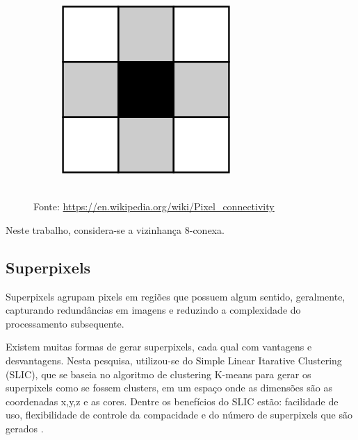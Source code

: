 \documentclass{article}
\begin{document}
\begin{figure}[H]
\begin{subfigure}[b]{50px}
				\includegraphics[width=\textwidth]{3.png}
			\end{subfigure}	\\
			{Fonte: \href{https://en.wikipedia.org/wiki/Pixel\_connectivity}{https://en.wikipedia.org/wiki/Pixel\_connectivity}}	
		\end{figure}
			
		Neste trabalho, considera-se a vizinhança 8-conexa. 
	
	\subsection{Superpixels}
		Superpixels agrupam pixels em regiões que possuem algum sentido, geralmente, capturando redundâncias em imagens e reduzindo a complexidade do processamento subsequente. 
		
		Existem muitas formas de gerar superpixels, cada qual com vantagens e desvantagens. Nesta pesquisa, utilizou-se do Simple Linear Itarative Clustering (SLIC), que se baseia no algoritmo de clustering K-means para gerar os superpixels como se fossem clusters, em um espaço onde as dimensões são as coordenadas x,y,z e as cores. Dentre os benefícios do SLIC estão: facilidade de uso, flexibilidade de controle da compacidade e do número de superpixels que são gerados \cite{Achanta:2012}. 
		
\end{document}
